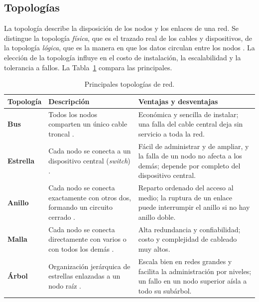 \subsection{Topologías}
\label{sec:prac04:topologias}

La topología describe la disposición de los nodos y los enlaces de una red. Se distingue la topología \emph{física}, que es el trazado real de los cables y dispositivos, de la topología \emph{lógica}, que es la manera en que los datos circulan entre los nodos \cite{forouzan:data-comm-networking:2013}. La elección de la topología influye en el costo de instalación, la escalabilidad y la tolerancia a fallos. La Tabla~\ref{tab:prac04:topologias} compara las principales.

\begin{table}[H]
    \centering
    \renewcommand{\arraystretch}{1.3}
    \begin{tabular}{|p{2.2cm}|p{6.0cm}|p{6.1cm}|}
        \hline
        \textbf{Topología} & \textbf{Descripción} & \textbf{Ventajas y desventajas} \\ \hline
        \textbf{Bus} & Todos los nodos comparten un único cable troncal \cite{tanenbaum:computer-networks:2021}. & Económica y sencilla de instalar; una falla del cable central deja sin servicio a toda la red. \\ \hline
        \textbf{Estrella} & Cada nodo se conecta a un dispositivo central (\emph{switch}) \cite{stallings:data-computer-comm:2014}. & Fácil de administrar y de ampliar, y la falla de un nodo no afecta a los demás; depende por completo del dispositivo central. \\ \hline
        \textbf{Anillo} & Cada nodo se conecta exactamente con otros dos, formando un circuito cerrado \cite{forouzan:data-comm-networking:2013}. & Reparto ordenado del acceso al medio; la ruptura de un enlace puede interrumpir el anillo si no hay anillo doble. \\ \hline
        \textbf{Malla} & Cada nodo se conecta directamente con varios o con todos los demás \cite{forouzan:data-comm-networking:2013}. & Alta redundancia y confiabilidad; costo y complejidad de cableado muy altos. \\ \hline
        \textbf{Árbol} & Organización jerárquica de estrellas enlazadas a un nodo raíz \cite{forouzan:data-comm-networking:2013}. & Escala bien en redes grandes y facilita la administración por niveles; un fallo en un nodo superior aísla a todo su subárbol. \\ \hline
    \end{tabular}
    \caption{Principales topologías de red.}
    \label{tab:prac04:topologias}
\end{table}

